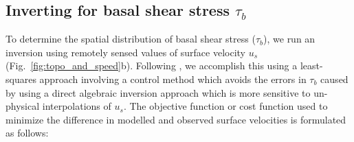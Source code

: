 





\subsection{Inverting for basal shear stress $\tau_b$}

To determine the spatial distribution of basal shear stress ($\tau_b$), we run an inversion using remotely sensed values of surface velocity $u_s$ (Fig.~\ref{fig:topo_and_speed}b).
Following \citet{MorlighemInversionbasalfriction2013}, we accomplish this using a least-squares approach involving a control method \citep[][eq. 6]{MacAyealbasalstressdistribution1992} which avoids the errors in $\tau_b$ caused by using a direct algebraic inversion approach \citep[e.g.][eq. 4, 5]{MacAyealbasalstressdistribution1992} which is more sensitive to un-physical interpolations of $u_s$.
The objective function or cost function \citep[$J$,][eq. 9]{MorlighemInversionbasalfriction2013} used to minimize the difference in modelled and observed surface velocities is formulated as follows:

